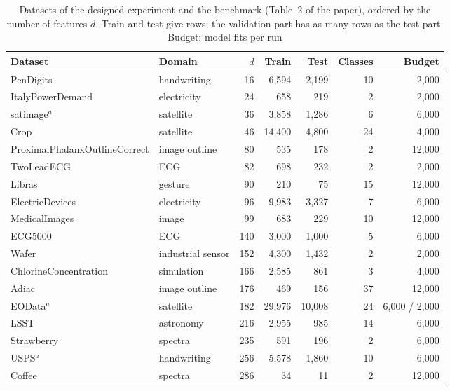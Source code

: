 \begin{table}[!htbp]
\caption{Datasets of the designed experiment and the benchmark (Table~2 of the paper), ordered by the number of features $d$. Train and test give rows; the validation part has as many rows as the test part. Budget: model fits per run}
\label{tab:s-datasets}
\centering
\footnotesize
\setlength{\tabcolsep}{3.5pt}
\begin{tabular}{@{}>{\raggedright\arraybackslash}p{31mm}lrrrrr@{}}
\toprule
Dataset & Domain & $d$ & Train & Test & Classes & Budget \\
\midrule
PenDigits & handwriting & 16 & 6{,}594 & 2{,}199 & 10 & 2{,}000 \\
ItalyPowerDemand & electricity & 24 & 658 & 219 & 2 & 2{,}000 \\
satimage$^{a}$ & satellite & 36 & 3{,}858 & 1{,}286 & 6 & 6{,}000 \\
Crop & satellite & 46 & 14{,}400 & 4{,}800 & 24 & 4{,}000 \\
ProximalPhalanx\-OutlineCorrect & image outline & 80 & 535 & 178 & 2 & 12{,}000 \\
TwoLeadECG & ECG & 82 & 698 & 232 & 2 & 2{,}000 \\
Libras & gesture & 90 & 210 & 75 & 15 & 12{,}000 \\
ElectricDevices & electricity & 96 & 9{,}983 & 3{,}327 & 7 & 6{,}000 \\
MedicalImages & image & 99 & 683 & 229 & 10 & 12{,}000 \\
ECG5000 & ECG & 140 & 3{,}000 & 1{,}000 & 5 & 6{,}000 \\
Wafer & industrial sensor & 152 & 4{,}300 & 1{,}432 & 2 & 2{,}000 \\
ChlorineConcentration & simulation & 166 & 2{,}585 & 861 & 3 & 4{,}000 \\
Adiac & image outline & 176 & 469 & 156 & 37 & 12{,}000 \\
EOData$^{a}$ & satellite & 182 & 29{,}976 & 10{,}008 & 24 & 6{,}000 / 2{,}000 \\
LSST & astronomy & 216 & 2{,}955 & 985 & 14 & 6{,}000 \\
Strawberry & spectra & 235 & 591 & 196 & 2 & 6{,}000 \\
USPS$^{a}$ & handwriting & 256 & 5{,}578 & 1{,}860 & 10 & 6{,}000 \\
Coffee & spectra & 286 & 34 & 11 & 2 & 12{,}000 \\

\end{tabular}
\end{table}

